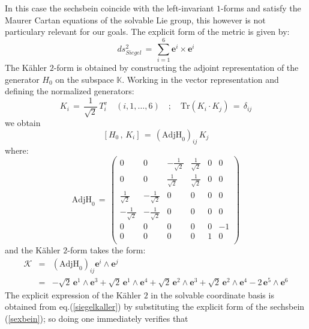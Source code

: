 \documentclass[10pt,a4paper]{article}
\begin{document}
In this case the sechsbein coincide with the left-invariant $1$-forms and satisfy the Maurer Cartan equations of the solvable Lie group, this however is not particulary relevant for our goals. The explicit form of the metric is given by:
\begin{equation}\label{dsqSiegel}
  ds^2_{Siegel} \, = \, \sum_{i=1}^{6} \mathbf{e}^i \times \mathbf{e}^i
\end{equation}
The K\"ahler $2$-form is obtained by constructing the adjoint representation of the generator $H_0$ on the subspace $\mathbb{K}$. Working in the vector representation and defining the normalized generators:
\begin{equation}\label{loffo}
  K_i \, =\, \frac{1}{\sqrt{2}}\, T^v_{i} \quad (i,1,\dots, 6) \quad; \quad \text{Tr}\left(K_i\cdot K_j\right) \, = \, \delta_{ij}
\end{equation}
we obtain
\begin{equation}\label{Cosroe}
  \left[H_0\, , \, K_i\right] \, = \, \left(\text{AdjH}_0\right)_{ij} \, K_j
\end{equation}
where:
\begin{equation}\label{cortanze}
  \text{AdjH}_0 \, = \,  \left(
\begin{array}{cccccc}
 0 & 0 & -\frac{1}{\sqrt{2}} & \frac{1}{\sqrt{2}} & 0 & 0 \\
 0 & 0 & \frac{1}{\sqrt{2}} & \frac{1}{\sqrt{2}} & 0 & 0 \\
 \frac{1}{\sqrt{2}} & -\frac{1}{\sqrt{2}} & 0 & 0 & 0 & 0 \\
 -\frac{1}{\sqrt{2}} & -\frac{1}{\sqrt{2}} & 0 & 0 & 0 & 0 \\
 0 & 0 & 0 & 0 & 0 & -1 \\
 0 & 0 & 0 & 0 & 1 & 0 \\
\end{array}
\right)
\end{equation}
and the K\"ahler $2$-form takes the form:
\begin{eqnarray}\label{siegelkaller}
  \boldsymbol{\mathcal{K}} & = &\left(\text{AdjH}_0\right)_{ij} \mathbf{e}^i\wedge \mathbf{e}^j \nonumber\\
  & = & -\sqrt{2} \, \mathbf{e}^1\wedge \mathbf{e}^3+\sqrt{2} \,\mathbf{e}^1\wedge \mathbf{e}^4+\sqrt{2} \, \mathbf{e}^2\wedge \mathbf{e}^3+\sqrt{2}\,
   \mathbf{e}^2\wedge \mathbf{e}^4-2 \, \mathbf{e}^5\wedge \mathbf{e}^6
\end{eqnarray}
The explicit expression of the K\"ahler $2$ in the solvable coordinate basis is obtained from eq.(\ref{siegelkaller}) by substituting the explicit form of the sechsbein (\ref{sexbein}); so doing  one immediately verifies that
\end{document}
